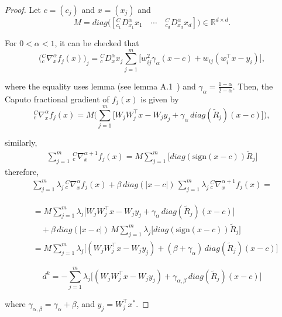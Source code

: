\documentclass[smallextended,referee,envcountsect]{svjour3}
\begin{document}
\begin{proof}
Let $c = (c_j)$ and $x = (x_j)$ and 
\begin{equation*}
M = diag\Big([^C_{c_1} D_{x_1}^{\alpha} x_1 \quad \cdots \quad ^C_{c_d} D_{x_d}^{\alpha} x_d ]\Big) \in \mathbb{R}^{d \times d}.
\end{equation*}

For $0 < \alpha < 1$, it can be checked that\cite{50}
\[
\Big( {}_{ {c}}^C \nabla_{x}^{\alpha} f_j(x) \Big)_j = {}^C_{c} D_{x}^{\alpha} x_j \sum_{j=1}^{m}\Big[ w_{ij}^2 \gamma_{\alpha}(x - c) + w_{ij}(  {w}_i^{\top} x - y_i ) \Big],
\]

where the equality uses lemma (see lemma A.1~\cite{50}) and $\gamma_{\alpha} = \frac{1 - \alpha}{2 - \alpha}$. Then, the Caputo fractional gradient of $f_j(x)$ is given by
\[
{}^{C}_{c}\nabla^{\alpha}_{x} f_j(x) = M \Big( \sum_{j=1}^{m} \Big[W_j W_j^\top x - W_j  {y}_j +  \gamma_{\alpha} \,  diag(\tilde{R}_j)(x - c)\Big] \Big),
\]

similarly,
\begin{align*}
\sum_{j=1}^{m}  \, {}^{C}_{c}\nabla^{\alpha+1}_{x} f_j(x) = M \sum_{j=1}^{m}  \Big[ diag(\mathrm{sign}(x - c)) \tilde{R}_j \Big]
\end{align*}
therefore,
\begin{align*}
\sum_{j=1}^{m} \lambda_j \, {}^{C}_{c}\nabla^{\alpha}_{x} f_j(x) + \beta \, diag(|x-c|) \, \sum_{j=1}^{m} \lambda_j \, {}^{C}_{c}\nabla^{\alpha+1}_{x} f_j(x) =
\end{align*}

\begin{align*}
&= M \sum_{j=1}^{m} \lambda_j \Big[ W_j W_j^\top x - W_j  {y}_j + \gamma_{\alpha} \, diag(\tilde{R}_j)(x - c) \Big] \\
&\quad + \beta \, diag(|x - c|) \, M \sum_{j=1}^{m} \lambda_j \Big[ diag(\mathrm{sign}(x - c)) \tilde{R}_j \Big] \\
&= M \sum_{j=1}^{m} \lambda_j \Big[ (W_j W_j^\top x - W_j  {y}_j) + (\beta + \gamma_\alpha) \, diag(\tilde{R}_j)(x - c) \Big]
\end{align*}

\begin{equation}
\label{eq:dk}
d^k = -\sum_{j=1}^{m} \lambda_j \Big[ (W_j W_j^\top x - W_j  {y}_j) + \gamma_{\alpha ,\beta} \,  diag(\tilde{R}_j)(x - c) \Big]
\end{equation}

\noindent where $\gamma_{\alpha, \beta} = \gamma_\alpha + \beta$, and $ {y}_j = W_j^\top x^*$.


\end{proof}
\end{document}

